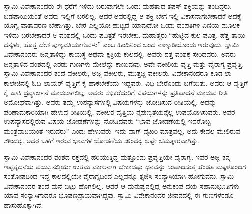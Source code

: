 ಸ್ವಾಮಿ ವಿವೇಕಾನಂದರು ಈ ಧರೆಗೆ ಇಳಿದು ಬರುವಾಗಲೇ ಒಂದು ಮಹತ್ತಾದ ತಪಸ್ ಶಕ್ತಿಯನ್ನು ತಂದಿದ್ದರು. ಬಡಪಾಯಿಯಂತೆ ಅವರು ಇಲ್ಲಿಗೆ ಬರಲಿಲ್ಲ. ಆದರೆ ಅವರಲ್ಲಿದ್ದ ಆ ಶಕ್ತಿ ಬೇಗ ಇಲ್ಲಿ ವಿಕಾಸವಾಗಬೇಕಾದರೆ ಅದಕ್ಕೆ ಯೊಗ್ಯ ವಾತಾವರಣ ಬೇಕಾಗಿತ್ತು. ಬೇರೆ ಎಲ್ಲಿಯೋ ಹುಟ್ಟದೆ ಯಾವುದೋ ಒಂದು ದಂಪತಿಗಳ ಏಣಿಯ ಮೂಲಕ ಇಳಿದು ಬರಬೇಕಾದರೆ ಆ ವಂಶದಲ್ಲಿ ಒಂದು ಪವಿತ್ರತೆ ಇರಬೇಕು. ಮಹಾತ್ಮರು “ಹುಟ್ಟಿದ ಕುಲ ಪವಿತ್ರ, ಹೆತ್ತ ತಾಯಿ ಧನ್ಯಳು, ಹೊತ್ತ ದೇಶ ಪುಣ್ಯವತಿಯಾಗುವಳು” ಎಂಬ ಹಿಂದಿನಿಂದ ಬಂದ ನಾಣ್ನುಡಿಯೊಂದು ಇರುವುದು. ಸ್ವಾಮಿ ವಿವೇಕಾನಂದರು ಜನ್ಮತಾಳಿದ್ದು ಕಾಯಸ್ಥ ಅಥವಾ ಕ್ಷತ್ರಿಯ ಕುಲದಲ್ಲಿ. ಅವರು ದತ್ತ ವಂಶಕ್ಕೆ ಸೇರಿದವರು. ಅವರು ಜನ್ಮತಾಳಿದ ವಂಶದಲ್ಲಿ ಎರಡು ಗುಣಗಳು ಮೇಲೆದ್ದು ಕಾಣುವುವು. ಅವೇ ವಕೀಲಿಯ ವೃತ್ತಿ ಮತ್ತು ವೈರಾಗ್ಯ ಪ್ರವೃತ್ತಿ. ಸ್ವಾಮಿ ವಿವೇಕಾನಂದರ ತಂದೆ ವಕೀಲರು, ಅಜ್ಜ ವಕೀಲರು, ಮುತ್ತಜ್ಜ ವಕೀಲರು. ವಿವೇಕಾನಂದರೂ ಕೂಡ ಲಾ ಕಾಲೇಜಿನಲ್ಲಿ ಓದಿ ಲಾಯರ್ ವೃತ್ತಿಗೆ ಕೈ ಹಾಕಬೇಕೆಂದು ಇದ್ದವರು. ವಿಧಿ ಬೇರೊಂದು ಬಗೆಯಿತು. ಅವರು ಆ ವೃತ್ತಿಗೆ ಕೈ ಹಾಕಿ ದ್ರವ್ಯಾರ್ಜನೆ ಮಾಡಲಾಗಲಿಲ್ಲ. ಅವರು ಸಭಿಕರೆದುರಿಗೆ ವಿಷಯಗಳನ್ನು ಪ್ರತಿಪಾದನೆ ಮಾಡುವ ರೀತಿ ಅಮೋಘವಾಗಿತ್ತು. ಅವರು ತಮ್ಮ ಉಪನ್ಯಾಸಗಳಲ್ಲಿ ವಿಷಯಗಳನ್ನು ಜೋಡಿಸುವ ರೀತಿಯಲ್ಲಿ, ಅದನ್ನು ಪರಿಣಾಮಕಾರಿಯಾಗಿ ಹೇಳುವ ರೀತಿಯಲ್ಲಿ, ವಕೀಲನ ವೃತ್ತಿಯ ನೈಪುಣ್ಯತೆಯನ್ನೆಲ್ಲ ಉಪಯೋಗಿಸುವರು. ಅವರ ಉಪನ್ಯಾಸದಲ್ಲಿರುವ ವಿಷಯ ಜೋಡಣೆಗಳನ್ನು ನೋಡಿದವರು “ಭಾವ ಜೋಡಣೆಯಲ್ಲಿ ಇವರೊಬ್ಬ ಮಂತ್ರವಾದಿಯಂತೆ ಇರುವರು” ಎಂದು ಹೇಳುವರು. ಇದು ವಾಗ್ ವೈಖರಿ ಮಾತ್ರವಲ್ಲ, ಅದು ಕೇವಲ ಮೇಲಿರುವ ಸೌಂದರ‍್ಯ. ಅದರ ಒಳಗೆ ಇರುವ ಭಾವಗಳ ಜೋಡಣೆಯ ಸೌಂದರ‍್ಯ ಅಷ್ಟೇ ಚಮತ್ಕಾರವಾಗಿತ್ತು.

ಸ್ವಾಮಿ ವಿವೇಕಾನಂದರ ವಂಶದ ರಕ್ತದಲ್ಲಿ ಹರಿಯುತ್ತಿದ್ದ ಮತ್ತೊಂದು ಪ್ರವೃತ್ತಿಯೇ ವೈರಾಗ್ಯ. ಇವರ ಅಜ್ಜ ತನ್ನ ಇಪ್ಪತ್ತೈದನೆಯ ವಯಸ್ಸಿನಲ್ಲಿಯೇ ಉತ್ತಮ ವಕೀಲನಾಗಿ ಬೇಕಾದಷ್ಟು ಧನವನ್ನು ಸಂಪಾದಿಸುತ್ತ ಹೆಂಡತಿ ಮಕ್ಕಳೊಂದಿಗೆ ಸಂತೋಷದಿಂದ ಇದ್ದ ಕಾಲದಲ್ಲಿಯೇ ವೈರಾಗ್ಯದಿಂದ ಎಲ್ಲವನ್ನೂ ತ್ಯಜಿಸಿ ಸಂನ್ಯಾಸಿಯಾಗಿ ಹೋಗುವನು. ಸ್ವಾಮಿ ವಿವೇಕಾನಂದರ ತಂದೆ ಮನೆ ಬಿಟ್ಟು ಹೊಗಲಿಲ್ಲ. ಆದರೆ ಆ ಮನುಷ್ಯನಲ್ಲಿದ್ದ ಅನುಕಂಪ ದಯೆ ಸಹಾನುಭೂತಿಗಳು ಯಾವ ಸಂನ್ಯಾಸಿಗಾದರೂ ಭೂಷಣಪ್ರಾಯವಾಗಿದ್ದವು. ಸ್ವಾಮಿ ವಿವೇಕಾನಂದರ ಜೀವನದಲ್ಲಿ ಈ ಗುಣಗಳೆರಡೂ ಹಾಸುಹೊಕ್ಕಾಗಿವೆ. 

